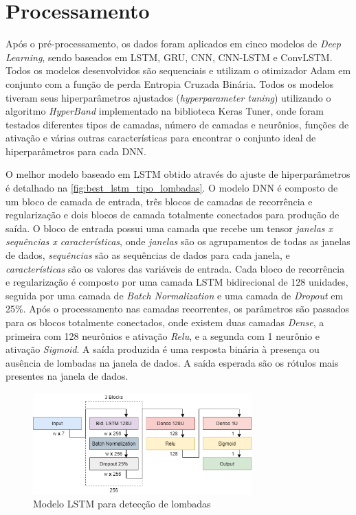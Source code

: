 \section{Processamento}

Após o pré-processamento, os dados foram aplicados em cinco modelos de \textit{Deep Learning}, sendo baseados em LSTM, GRU, CNN, CNN-LSTM e ConvLSTM. Todos os modelos desenvolvidos são sequenciais e utilizam o otimizador Adam em conjunto com a função de perda Entropia Cruzada Binária. Todos os modelos tiveram seus hiperparâmetros ajustados (\textit{hyperparameter tuning}) utilizando o algoritmo \textit{HyperBand} implementado na biblioteca Keras Tuner, onde foram testados diferentes tipos de camadas, número de camadas e neurônios, funções de ativação e várias outras características para encontrar o conjunto ideal de hiperparâmetros para cada DNN. 

O melhor modelo baseado em LSTM obtido através do ajuste de hiperparâmetros é detalhado na \autoref{fig:best_lstm_tipo_lombadas}. O modelo DNN é composto de um bloco de camada de entrada, três blocos de camadas de recorrência e regularização e dois blocos de camada totalmente conectados para produção de saída. O bloco de entrada possui uma camada que recebe um tensor \emph{janelas x sequências x características}, onde \emph{janelas} são os agrupamentos de todas as janelas de dados, \emph{sequências} são as sequências de dados para cada janela, e \emph{características} são os valores das variáveis de entrada. Cada bloco de recorrência e regularização é composto por uma camada LSTM bidirecional de 128 unidades, seguida por uma camada de \textit{Batch Normalization} e uma camada de \textit{Dropout} em 25\%. Após o processamento nas camadas recorrentes, os parâmetros são passados para os blocos totalmente conectados, onde existem duas camadas \textit{Dense}, a primeira com 128 neurônios e ativação \textit{Relu}, e a segunda com 1 neurônio e ativação \textit{Sigmoid}. A saída produzida é uma resposta binária à presença ou ausência de lombadas na janela de dados. A saída esperada são os rótulos mais presentes na janela de dados.

\begin{figure}[h!]
  \centering
  \caption{Modelo LSTM para detecção de lombadas}
  \label{fig:best_lstm_tipo_lombadas}
  \includegraphics[width=0.75\textwidth]{figuras/fig_40.png}
\end{figure}

